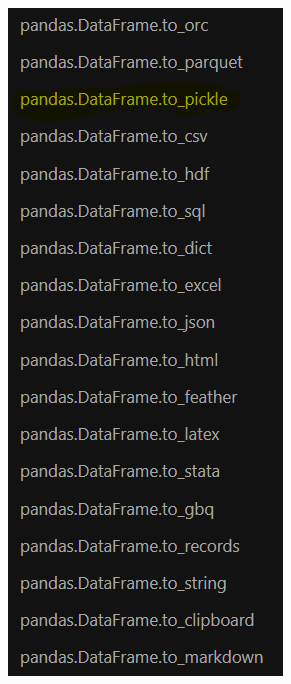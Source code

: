 \documentclass[
  letterpaper,
  DIV=11,
  numbers=noendperiod]{scrreprt}
\begin{document}
\begin{figure}

\begin{minipage}[c]{0.50\linewidth}

{\centering 

\includegraphics{./images/getting-data-with-pandas/save_df.png}

}

\end{minipage}%
%
\begin{minipage}[c]{0.50\linewidth}

{\centering 

\raisebox{-\height}{

}}
\end{minipage}
\end{figure}
\end{document}

